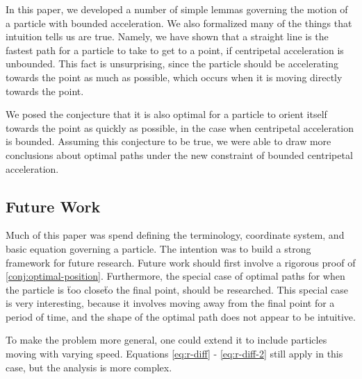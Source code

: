 In this paper, we developed a number of simple lemmas governing the motion of a particle with bounded acceleration. We also formalized many of the things that intuition tells us are true. Namely, we have shown that a straight line is the fastest path for a particle to take to get to a point, if centripetal acceleration is unbounded. This fact is unsurprising, since the particle should be accelerating towards the point as much as possible, which occurs when it is moving directly towards the point. 

We posed the conjecture that it is also optimal for a particle to orient itself towards the point as quickly as possible, in the case when centripetal acceleration is bounded. Assuming this conjecture to be true, we were able to draw more conclusions about optimal paths under the new constraint of bounded centripetal acceleration. 

\subsection{Future Work}

Much of this paper was spend defining the terminology, coordinate system, and basic equation governing a particle. The intention was to build a strong framework for future research. Future work should first involve a rigorous proof of \ref{conj:optimal-position}. Furthermore, the special case of optimal paths for when the particle is \"too close\" to the final point, should be researched. This special case is very interesting, because it involves moving away from the final point for a period of time, and the shape of the optimal path does not appear to be intuitive.

To make the problem more general, one could extend it to include particles moving with varying speed. Equations \ref{eq:r-diff} - \ref{eq:r-diff-2} still apply in this case, but the analysis is more complex.